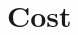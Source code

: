 \documentclass[oneside,11pt]{amsart}
\begin{document}
\section{Cost}
\label{sec:cost}



\newpage

\begin{multicols}{2}
\scriptsize


\end{multicols}
\end{document}
